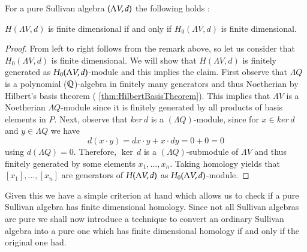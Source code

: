 \begin{Proposition}
\label{prop:FiniteDimensionDependentOnDegreeOne}
 For a pure Sullivan algebra $(\Lambda V,d)$ the following holds :
 
  $H(\Lambda V,d)$ is finite dimensional if and only if $H_0(\Lambda V,d)$ is finite dimensional.
 
\end{Proposition}

\begin{proof}
 From left to right follows from the remark above, so let us consider that $H_0(\Lambda V,d)$ is finite dimensional.
 We will show that $H(\Lambda V, d)$ is finitely generated as $H_0 (\Lambda V,d)$-module and this implies the claim.
 First observe that $\Lambda Q$ is a polynomial ($\mathbb{Q}$)-algebra in finitely many generators and thus Noetherian by
 Hilbert's basis theorem ( \ref{thm:HilbertBasisTheorem}). This implies that $\Lambda V$ is a Noetherian $\Lambda Q$-module since it is 
 finitely generated by all products of basis elements in $ P$. Next, observe that
 $ker \, d$ is a $(\Lambda Q)$-module, since for $x \in ker \, d$ and  $y \in \Lambda Q$ we have
 $$ d(x \cdot y) = dx \cdot y + x \cdot dy = 0 + 0 = 0$$
 using $d(\Lambda Q) = 0$. Therefore, $\ker \, d$ is a $(\Lambda Q)$-submodule of $\Lambda V$ and thus 
 finitely generated by some elements $x_1, \ldots, x_n$. Taking homology yields that $[x_1], \ldots, [x_n]$
 are generators of $H (\Lambda V,d)$ as $H_0 (\Lambda V,d)$-module.
\end{proof}

Given this we have a simple criterion at hand which allows us to check if a pure Sullivan algebra has finite dimensional
homology. Since not all Sullivan algebras are pure we shall now introduce a technique to convert an ordinary Sullivan algebra
into a pure one which has finite dimensional homology if and only if the original one had.

